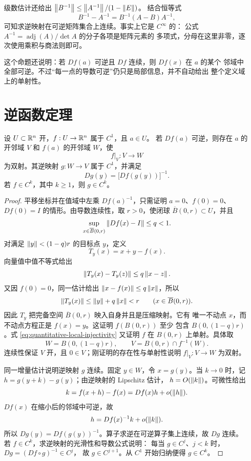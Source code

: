 级数估计还给出
\(\left\lVert B^{-1}\right\rVert\le\left\lVert A^{-1}\right\rVert/(1-\left\lVert E\right\rVert)\)。
结合恒等式
\[
 B^{-1}-A^{-1}=B^{-1}(A-B)A^{-1},
\]
可知求逆映射在可逆矩阵集合上连续。事实上它是 \(C^\infty\) 的：
公式 \(A^{-1}=\operatorname{adj}(A)/\det A\) 的分子各项是矩阵元素的
多项式，分母在这里非零，逐次使用乘积与商法则即可。

这个命题还说明：若 $Df(a)$ 可逆且 $Df$ 连续，则 $Df(x)$ 在 $a$ 的某个
邻域中全部可逆。不过“每一点的导数可逆”仍只是局部信息，并不自动给出
整个定义域上的单射性。

\section{逆函数定理}

\begin{theorem}[逆函数定理]
\label{thm:finite-dimensional-inverse-function}
设 $U\subset\mathbb{R}^n$ 开，$f:U\to\mathbb{R}^n$ 属于 $C^1$，且 $a\in U$。
若 $Df(a)$ 可逆，则存在 $a$ 的开邻域 $V$ 和 $f(a)$ 的开邻域 $W$，使
\[
 f|_V:V\longrightarrow W
\]
为双射。其逆映射 $g:W\to V$ 属于 $C^1$，并满足
\[
 Dg(y)=\bigl[Df(g(y))\bigr]^{-1}.
\]
若 $f\in C^k$，其中 $k\ge1$，则 $g\in C^k$。
\end{theorem}

\begin{proof}
平移坐标并在值域中左乘 $Df(a)^{-1}$，只需证明
$a=0$、$f(0)=0$、$Df(0)=I$ 的情形。由导数连续性，取 $r>0$，使闭球
$\overline B(0,r)\subset U$，并且
\[
 \sup_{x\in\overline B(0,r)}\left\lVert Df(x)-I\right\rVert\le q<1.
\]
对满足 $\left\lVert y\right\rVert<(1-q)r$ 的目标点 $y$，定义
\[
 T_y(x)=x+y-f(x).
\]
向量值中值不等式给出
\[
 \left\lVert T_y(x)-T_y(z)\right\rVert\le q\left\lVert x-z\right\rVert.
\]
又因 $f(0)=0$，同一估计给出 $\left\lVert x-f(x)\right\rVert\le q\left\lVert x\right\rVert$，所以
\[
 \left\lVert T_y(x)\right\rVert\le\left\lVert y\right\rVert+q\left\lVert x\right\rVert<r
 \qquad(x\in\overline B(0,r)).
\]
因此 $T_y$ 把完备空间 $\overline B(0,r)$ 映入自身并且是压缩映射。它有
唯一不动点 $x$，而不动点方程正是 $f(x)=y$。这证明 $f(B(0,r))$ 至少
包含 $B(0,(1-q)r)$。式 \eqref{eq:quantitative-local-injectivity} 又证明
$f$ 在 $B(0,r)$ 上单射。具体取
\[
 W=B(0,(1-q)r),\qquad V=B(0,r)\cap f^{-1}(W).
\]
连续性保证 \(V\) 开，且 \(0\in V\)；刚证明的存在性与单射性说明
\(f|_V:V\to W\) 为双射。

同一增量估计说明逆映射 $g$ 连续。固定 $y\in W$，令 $x=g(y)$。当
$k\to0$ 时，记 $h=g(y+k)-g(y)$；由逆映射的 Lipschitz 估计，
$h=O(\left\lVert k\right\rVert)$。可微性给出
\[
 k=f(x+h)-f(x)=Df(x)h+o(\left\lVert h\right\rVert).
\]
$Df(x)$ 在缩小后的邻域中可逆，故
\[
 h=Df(x)^{-1}k+o(\left\lVert k\right\rVert).
\]
所以 $Dg(y)=Df(g(y))^{-1}$。算子求逆在可逆算子集上连续，故 $Dg$ 连续。
若 \(f\in C^k\)，求逆映射的光滑性和导数公式说明：
每当 \(g\in C^j\)、\(j<k\) 时，\(Dg=(Df\circ g)^{-1}\in C^j\)，
故 \(g\in C^{j+1}\)。从 \(C^1\) 开始归纳便得 \(g\in C^k\)。
\end{proof}

